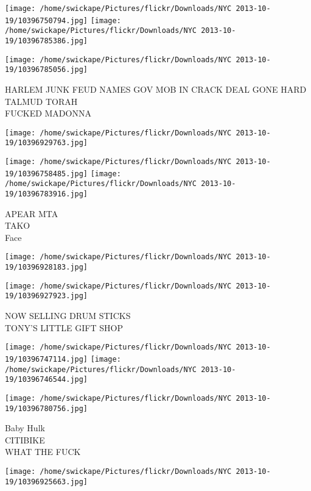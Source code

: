 \documentclass[10pt,letterpaper]{article}
\begin{document}
\texttt{[image: /home/swickape/Pictures/flickr/Downloads/NYC 2013-10-19/10396750794.jpg]}
\texttt{[image: /home/swickape/Pictures/flickr/Downloads/NYC 2013-10-19/10396785386.jpg]}

\vspace{0.25in}
\texttt{[image: /home/swickape/Pictures/flickr/Downloads/NYC 2013-10-19/10396785056.jpg]}

HARLEM JUNK FEUD NAMES GOV MOB IN CRACK DEAL GONE HARD\\
TALMUD TORAH\\
FUCKED MADONNA\\
\pagebreak

\texttt{[image: /home/swickape/Pictures/flickr/Downloads/NYC 2013-10-19/10396929763.jpg]}

\vspace{0.25in}
\texttt{[image: /home/swickape/Pictures/flickr/Downloads/NYC 2013-10-19/10396758485.jpg]}
\texttt{[image: /home/swickape/Pictures/flickr/Downloads/NYC 2013-10-19/10396783916.jpg]}

APEAR MTA\\
TAKO\\
Face\\
\pagebreak

\texttt{[image: /home/swickape/Pictures/flickr/Downloads/NYC 2013-10-19/10396928183.jpg]}

\vspace{0.25in}
\texttt{[image: /home/swickape/Pictures/flickr/Downloads/NYC 2013-10-19/10396927923.jpg]}

NOW SELLING DRUM STICKS\\
TONY'S LITTLE GIFT SHOP\\
\pagebreak

\texttt{[image: /home/swickape/Pictures/flickr/Downloads/NYC 2013-10-19/10396747114.jpg]}
\texttt{[image: /home/swickape/Pictures/flickr/Downloads/NYC 2013-10-19/10396746544.jpg]}

\texttt{[image: /home/swickape/Pictures/flickr/Downloads/NYC 2013-10-19/10396780756.jpg]}

Baby Hulk\\
CITIBIKE\\
WHAT THE FUCK\\
\pagebreak

\texttt{[image: /home/swickape/Pictures/flickr/Downloads/NYC 2013-10-19/10396925663.jpg]}
\end{document}
